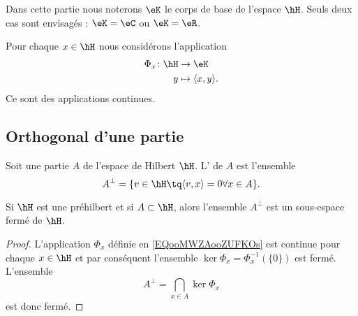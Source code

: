 Dans cette partie nous noterons \( \eK\) le corps de base de l'espace \( \hH\). Seuls deux cas sont envisagés : \( \eK=\eC\) ou \( \eK=\eR\).

Pour chaque \( x\in\hH\) nous considérons l'application
\begin{equation}        \label{EQooMWZAooZUFKOs}
    \begin{aligned}
        \Phi_x\colon \hH&\to \eK \\
        y&\mapsto \langle x, y\rangle . 
    \end{aligned}
\end{equation}
Ce sont des applications continues.

\subsection{Orthogonal d'une partie}

\begin{definition}  \label{DEFooXUXQooMmDnhW}
    Soit une partie \( A\) de l'espace de Hilbert \( \hH\). L' de \( A\) est l'ensemble
    \begin{equation}
        A^{\perp}=\{ v\in\hH\tq \langle v, x\rangle =0\forall x\in A \}.
    \end{equation}
\end{definition}

\begin{proposition}     \label{PropdpaMpH}
    Si \( \hH\) est une préhilbert et si \( A\subset \hH\), alors l'ensemble \( A^{\perp}\) est un sous-espace fermé de \( \hH\).
\end{proposition}

\begin{proof}
    L'application \( \Phi_x\) définie en \eqref{EQooMWZAooZUFKOs} est continue pour chaque \( x\in\hH\) et par conséquent l'ensemble \( \ker\Phi_x=\Phi_x^{-1}(\{ 0 \})\) est fermé. L'ensemble
    \begin{equation}
        A^{\perp}=\bigcap_{x\in A}\ker\Phi_x
    \end{equation}
    est donc fermé.    
\end{proof}

